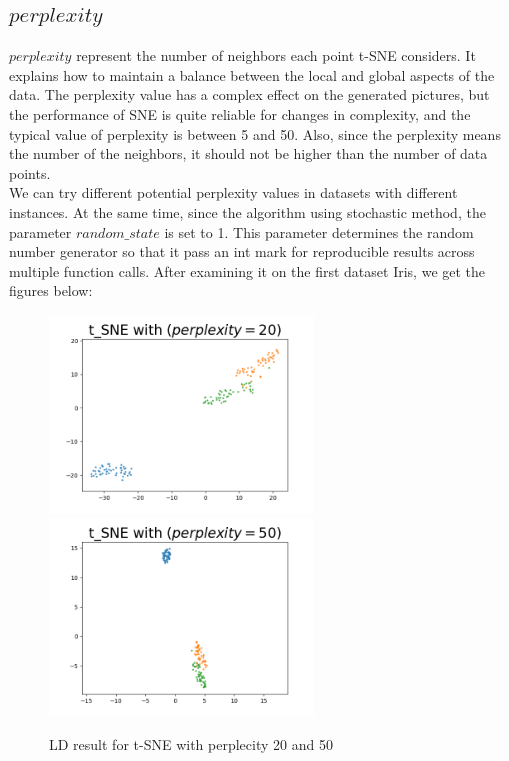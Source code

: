 \subsection{$perplexity$}

\noindent $perplexity$ represent the number of neighbors each point t-SNE considers. It explains how to maintain a balance between the local and global aspects of the data. The perplexity value has a complex effect on the generated pictures, but the performance of SNE is quite reliable for changes in complexity, and the typical value of perplexity is between 5 and 50\cite{ref9}. Also, since the perplexity means the number of the neighbors, it should not be higher than the number of data points.\\

\noindent We can try different potential perplexity values in datasets with different instances. At the same time, since the algorithm using stochastic method, the parameter $random\_state$ is set to 1. This parameter determines the random number generator so that it pass an int mark for reproducible results across multiple function calls. After examining it on the first dataset Iris, we get the figures below:

\begin{figure}[H]
\centering  %
{
\label{Fig.sub.1}
\includegraphics[width=7cm,height=3.5cm\textwidth]{images/image_comparison_tsne_perp20.png}}
{
\label{Fig.sub.2}
\includegraphics[width=7cm,height=3.5cm\textwidth]{images/image_comparison_tsne_perp50.png}}
\caption{LD result for t-SNE with perplecity 20 and 50}
\end{figure}

